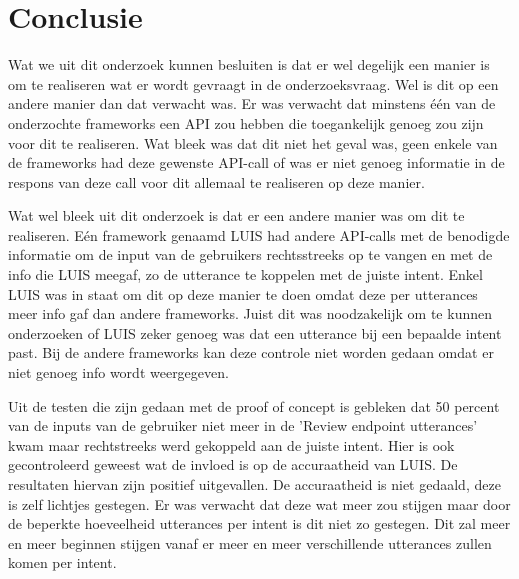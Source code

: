 
\chapter{Conclusie}
\label{ch:conclusie}


Wat we uit dit onderzoek kunnen besluiten is dat er wel degelijk een manier is om te realiseren wat er wordt gevraagt in de onderzoeksvraag. Wel is dit op een andere manier dan dat verwacht was. Er was verwacht dat minstens één van de onderzochte frameworks een API zou hebben die toegankelijk genoeg zou zijn voor dit te realiseren. Wat bleek was dat dit niet het geval was, geen enkele van de frameworks had deze gewenste API-call of was er niet genoeg informatie in de respons van deze call voor dit allemaal te realiseren op deze manier.

Wat wel bleek uit dit onderzoek is dat er een andere manier was om dit te realiseren. Eén framework genaamd LUIS had andere API-calls met de benodigde informatie om de input van de gebruikers rechtsstreeks op te vangen en met de info die LUIS meegaf, zo de utterance te koppelen met de juiste intent. Enkel LUIS was in staat om dit op deze manier te doen omdat deze per utterances meer info gaf dan andere frameworks. Juist dit was noodzakelijk om te kunnen onderzoeken of LUIS zeker genoeg was dat een utterance bij een bepaalde intent past. Bij de andere frameworks kan deze controle niet worden gedaan omdat er niet genoeg info wordt weergegeven.

Uit de testen die zijn gedaan met de proof of concept is gebleken dat 50 percent van de inputs van de gebruiker niet meer in de 'Review endpoint utterances' kwam maar rechtstreeks werd gekoppeld aan de juiste intent. Hier is ook gecontroleerd geweest wat de invloed is op de accuraatheid van LUIS. De resultaten hiervan zijn positief uitgevallen. De accuraatheid is niet gedaald, deze is zelf lichtjes gestegen. Er was verwacht dat deze wat meer zou stijgen maar door de beperkte hoeveelheid utterances per intent is dit niet zo gestegen. Dit zal meer en meer beginnen stijgen vanaf er meer en meer verschillende utterances zullen komen per intent.

